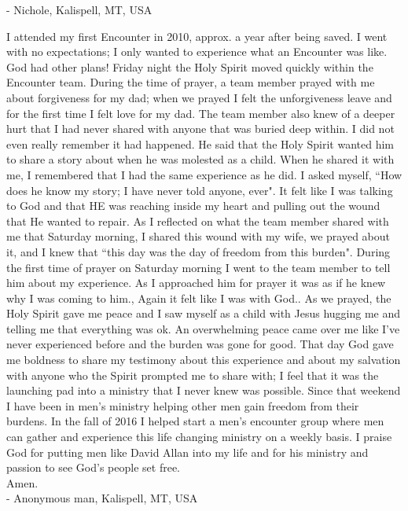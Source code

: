 \documentclass[twoside, 12pt]{book}
\begin{document}
- Nichole, Kalispell, MT, USA
\clearpage

I attended my first Encounter in 2010, approx. a year after being saved. I went with no expectations; I only wanted to experience what an Encounter was like. God had other plans!
Friday night the Holy Spirit moved quickly within the Encounter team. During the time of prayer, a team member prayed with me about forgiveness for my dad; when we prayed I felt the unforgiveness leave and for the first time I felt love for my dad. The team member also knew of a deeper hurt that I had never shared with anyone that was buried deep within. I did not even really remember it had happened. He said that the Holy Spirit wanted him to share a story about when he was molested as a child. When he shared it with me, I remembered that I had the same experience as he did. I asked myself, ``How does he know my story; I have never told anyone, ever". It felt like I was talking to God and that HE was reaching inside my heart and pulling out the wound that He wanted to repair.
As I reflected on what the team member shared with me that Saturday morning, I shared this wound with my wife, we prayed about it, and I knew that ``this day was the day of freedom from this burden".
During the first time of prayer on Saturday morning I went to the team member to tell him about my experience. As I approached him for prayer it was as if he knew why I was coming to him., Again it felt like I was with God.. As we prayed, the Holy Spirit gave me peace and I saw myself as a child with Jesus hugging me and telling me that everything was ok. An overwhelming peace came over me like I've never experienced before and the burden was gone for good.
That day God gave me boldness to share my testimony about this experience and about my salvation with anyone who the Spirit prompted me to share with; I feel that it was the launching pad into a ministry that I never knew was possible.
Since that weekend I have been in men's ministry helping other men gain freedom from their burdens. In the fall of 2016 I helped start a men's encounter group where men can gather and experience this life changing ministry on a weekly basis.
I praise God for putting men like David Allan into my life and for his ministry and passion to see God's people set free.\\

Amen. \\

- Anonymous man, Kalispell, MT, USA
\clearpage
\end{document}
